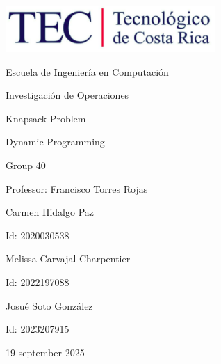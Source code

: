 \documentclass{article}
\begin{document}
\begin{titlepage}
    \centering
    \includegraphics[width=0.6\textwidth]{logo-tec.png}\par\vspace{1cm}

    {\large Escuela de Ingeniería en Computación\par}
    {\large Investigación de Operaciones\par}
    \vspace{2cm}

    {\Large Knapsack Problem\par}
    {\large Dynamic Programming\par}
    \vspace{2cm}

    {\large Group 40\par}
    {\large Professor: Francisco Torres Rojas\par}
    \vspace{3cm}

    {\large Carmen Hidalgo Paz\par}
    {\large Id: 2020030538\par}
    \vspace{1cm}
    {\large Melissa Carvajal Charpentier\par}
    {\large Id: 2022197088\par}
    \vspace{1cm}
    {\large Josué Soto González\par}
    {\large Id: 2023207915\par}
    \vspace{1cm}

    {\large 19 september 2025\par}
\end{titlepage}

\newpage
\end{document}
